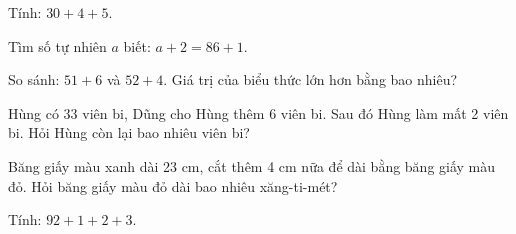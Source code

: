 \begin{ex}
Tính: $30 + 4 + 5$.
\end{ex}

\begin{ex}
Tìm số tự nhiên $a$ biết: $a + 2 = 86 + 1$.
\end{ex}

\begin{ex}
So sánh: $51 + 6$ và $52 + 4$. Giá trị của biểu thức lớn hơn bằng bao nhiêu?
\end{ex}

\begin{ex}
Hùng có 33 viên bi, Dũng cho Hùng thêm 6 viên bi. Sau đó Hùng làm mất 2 viên bi. Hỏi Hùng còn lại bao nhiêu viên bi?
\end{ex}

\begin{ex}
Băng giấy màu xanh dài 23 cm, cắt thêm 4 cm nữa để dài bằng băng giấy màu đỏ. Hỏi băng giấy màu đỏ dài bao nhiêu xăng-ti-mét?
\end{ex}

\begin{ex}
Tính: $92 + 1 + 2 + 3$.
\end{ex}
